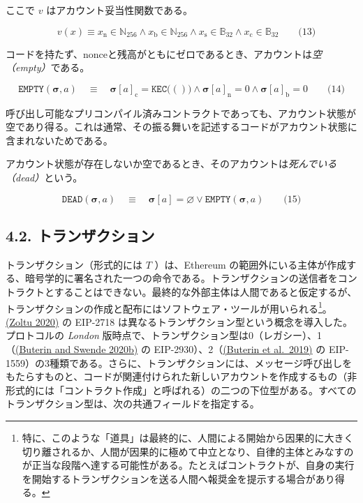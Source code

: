 \documentclass[
]{ltjsarticle}
\begin{document}
ここで \(v\) はアカウント妥当性関数である。

\protect\hypertarget{eq-13}{}{}

\[\quad v(x) \equiv x_{\mathrm{n}} \in \mathbb{N}_{256} \wedge x_{\mathrm{b}} \in \mathbb{N}_{256} \wedge x_{\mathrm{s}} \in \mathbb{B}_{32} \wedge x_{\mathrm{c}} \in \mathbb{B}_{32} \qquad \text{(13)}\]

コードを持たず、nonceと残高がともにゼロであるとき、アカウントは\emph{空（empty）}である。

\protect\hypertarget{eq-14}{}{}

\[\mathtt{EMPTY}(\boldsymbol{\sigma}, a) \quad\equiv\quad \boldsymbol{\sigma}[a]_{\mathrm{c}} = \texttt{KEC}\big(()\big) \wedge \boldsymbol{\sigma}[a]_{\mathrm{n}} = 0 \wedge \boldsymbol{\sigma}[a]_{\mathrm{b}} = 0 \qquad \text{(14)}\]

呼び出し可能なプリコンパイル済みコントラクトであっても、アカウント状態が空であり得る。これは通常、その振る舞いを記述するコードがアカウント状態に含まれないためである。

アカウント状態が存在しないか空であるとき、そのアカウントは\emph{死んでいる（dead）}という。

\protect\hypertarget{eq-15}{}{}

\[\mathtt{DEAD}(\boldsymbol{\sigma}, a) \quad\equiv\quad \boldsymbol{\sigma}[a] = \varnothing \vee \mathtt{EMPTY}(\boldsymbol{\sigma}, a) \qquad \text{(15)}\]

\protect\hypertarget{subsec:transaction}{}{}

\hypertarget{ux30c8ux30e9ux30f3ux30b6ux30afux30b7ux30e7ux30f3}{%
\subsection{4.2.
トランザクション}\label{ux30c8ux30e9ux30f3ux30b6ux30afux30b7ux30e7ux30f3}}

トランザクション（形式的には \(T\) ）は、Ethereum
の範囲外にいる主体が作成する、暗号学的に署名された一つの命令である。トランザクションの送信者をコントラクトとすることはできない。最終的な外部主体は人間であると仮定するが、トランザクションの作成と配布にはソフトウェア・ツールが用いられる\footnote{特に、このような「道具」は最終的に、人間による開始から因果的に大きく切り離されるか、人間が因果的に極めて中立となり、自律的主体とみなすのが正当な段階へ達する可能性がある。たとえばコントラクトが、自身の実行を開始するトランザクションを送る人間へ報奨金を提示する場合があり得る。}。\protect\hyperlink{ref-EIP-2718}{(Zoltu
2020)} の EIP-2718
は異なるトランザクション型という概念を導入した。プロトコルの
\emph{London}
版時点で、トランザクション型は0（レガシー）、1（\protect\hyperlink{ref-EIP-2930}{(Buterin
and Swende 2020b)} の
EIP-2930）、2（\protect\hyperlink{ref-EIP-1559}{(Buterin et al.~2019)}
の
EIP-1559）の3種類である。さらに、トランザクションには、メッセージ呼び出しをもたらすものと、コードが関連付けられた新しいアカウントを作成するもの（非形式的には「コントラクト作成」と呼ばれる）の二つの下位型がある。すべてのトランザクション型は、次の共通フィールドを指定する。
\end{document}
